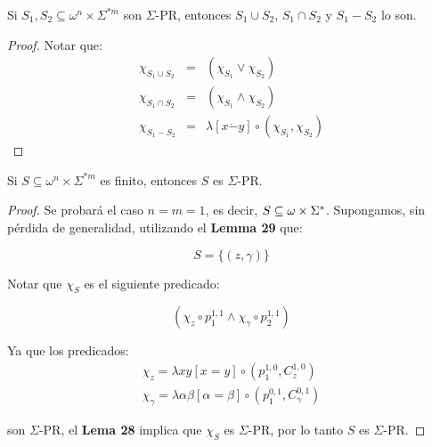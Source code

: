   \begin{lemma}
    \PN Si $S_{1}, S_{2} \subseteq \omega^{n} \times \Sigma^{\ast m}$ son $\Sigma$-PR, entonces $S_{1} \cup S_{2}$,
    $S_{1} \cap S_{2}$ y $S_{1} - S_{2}$ lo son.
  \end{lemma}
  \begin{proof}
    \PN Notar que:
    \begin{eqnarray*}
      \chi_{S_{1} \cup S_{2}} &=& (\chi_{S_{1}} \vee \chi_{S_{2}}) \\
      \chi_{S_{1} \cap S_{2}} &=& (\chi_{S_{1}} \wedge \chi_{S_{2}}) \\
      \chi_{S_{1} - S_{2}} &=& \lambda \left[x \dot{-} y\right] \circ (\chi_{S_{1}}, \chi_{S_{2}})
    \end{eqnarray*}
  \end{proof}

  \begin{corollary}
    \PN Si $S \subseteq \omega^{n} \times \Sigma^{\ast m}$ es finito, entonces $S$ es $\Sigma$-PR.
  \end{corollary}
  \begin{proof}
    \PN Se probará el caso $n = m = 1$, es decir, $S \subseteq \omega \times \Sigma^{\ast}$. Supongamos, sin pérdida de
    generalidad, utilizando el \textbf{Lemma 29} que:

    \[
      S = \{(z, \gamma)\}
    \]

    \PN Notar que $\chi_{S}$ es el siguiente predicado:

    \[
      \left(\chi_{z} \circ p_{1}^{1,1} \wedge \chi_{\gamma} \circ p_{2}^{1,1}\right)
    \]

    \PN Ya que los predicados:
    \begin{eqnarray*}
      \chi_{z} = \lambda xy \left[x = y\right] \circ \left(p_{1}^{1,0}, C_{z}^{1,0}\right) \\
      \chi_{\gamma} = \lambda \alpha\beta \left[\alpha = \beta\right] \circ \left(p_{1}^{0,1},
      C_{\gamma}^{0,1}\right)
    \end{eqnarray*}

    \PN son $\Sigma$-PR, el \textbf{Lema 28} implica que $\chi_{S}$ es $\Sigma$-PR, por lo tanto $S$ es $\Sigma$-PR.
  \end{proof}

